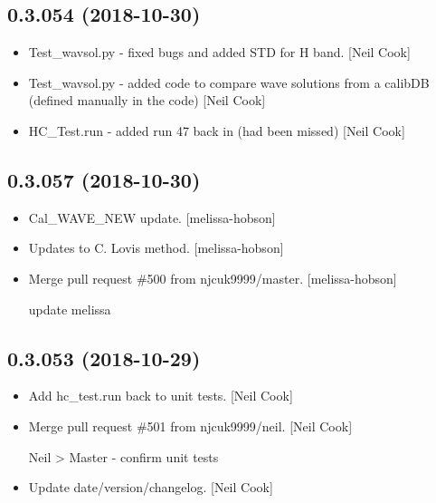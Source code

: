 \documentclass[a4paper,10pt,english]{report}
\begin{document}
\subsection{0.3.054 (2018-10-30)}
\label{\detokenize{misc/changelog:id275}}\begin{itemize}
\item {} 
Test\_wavsol.py - fixed bugs and added STD for H band. {[}Neil Cook{]}

\item {} 
Test\_wavsol.py - added code to compare wave solutions from a calibDB
(defined manually in the code) {[}Neil Cook{]}

\item {} 
HC\_Test.run - added run 47 back in (had been missed) {[}Neil Cook{]}

\end{itemize}


\subsection{0.3.057 (2018-10-30)}
\label{\detokenize{misc/changelog:id276}}\begin{itemize}
\item {} 
Cal\_WAVE\_NEW update. {[}melissa-hobson{]}

\item {} 
Updates to C. Lovis method. {[}melissa-hobson{]}

\item {} 
Merge pull request \#500 from njcuk9999/master. {[}melissa-hobson{]}

update melissa

\end{itemize}


\subsection{0.3.053 (2018-10-29)}
\label{\detokenize{misc/changelog:id277}}\begin{itemize}
\item {} 
Add hc\_test.run back to unit tests. {[}Neil Cook{]}

\item {} 
Merge pull request \#501 from njcuk9999/neil. {[}Neil Cook{]}

Neil \textendash{}\textgreater{} Master - confirm unit tests

\item {} 
Update date/version/changelog. {[}Neil Cook{]}

\end{itemize}
\end{document}
